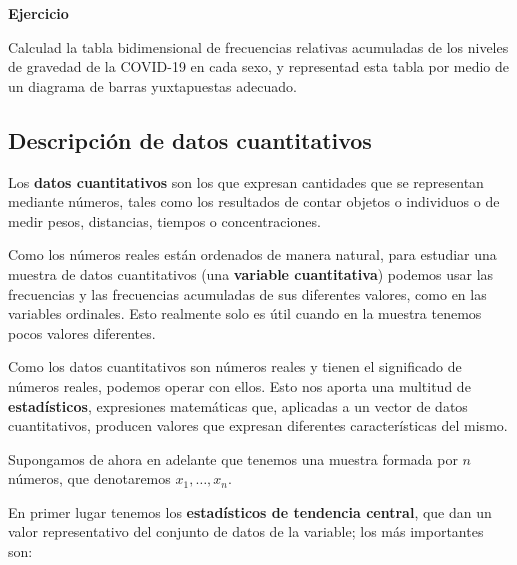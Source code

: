 \documentclass[
  spanish,
  letterpaper,
  DIV=11,
  numbers=noendperiod]{scrreprt}
\begin{document}
\textbf{Ejercicio}

Calculad la tabla bidimensional de frecuencias relativas acumuladas de
los niveles de gravedad de la COVID-19 en cada sexo, y representad esta
tabla por medio de un diagrama de barras yuxtapuestas adecuado.

\subsection{Descripción de datos
cuantitativos}\label{descripciuxf3n-de-datos-cuantitativos}

Los \textbf{datos cuantitativos} son los que expresan cantidades que se
representan mediante números, tales como los resultados de contar
objetos o individuos o de medir pesos, distancias, tiempos o
concentraciones.

Como los números reales están ordenados de manera natural, para estudiar
una muestra de datos cuantitativos (una \textbf{variable cuantitativa})
podemos usar las frecuencias y las frecuencias acumuladas de sus
diferentes valores, como en las variables ordinales. Esto realmente solo
es útil cuando en la muestra tenemos pocos valores diferentes.

Como los datos cuantitativos son números reales y tienen el significado
de números reales, podemos operar con ellos. Esto nos aporta una
multitud de \textbf{estadísticos}, expresiones matemáticas que,
aplicadas a un vector de datos cuantitativos, producen valores que
expresan diferentes características del mismo.

Supongamos de ahora en adelante que tenemos una muestra formada por
\(n\) números, que denotaremos \(x_1,\ldots,x_n\).

En primer lugar tenemos los \textbf{estadísticos de tendencia central},
que dan un valor representativo del conjunto de datos de la variable;
los más importantes son:
\end{document}
